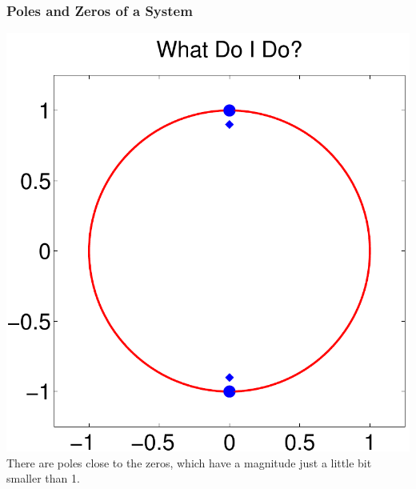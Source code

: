 \documentclass[mathserif,9pt,handout]{beamer}
\begin{document}
\begin{frame}\frametitle{Poles and Zeros of a System}\small
  \begin{center}
    \includegraphics[height=.7\textheight]{notch_zp.pdf} \\
    There are poles close to the zeros, which have a magnitude just a little bit smaller than 1. 
  \end{center}
\end{frame}
\end{document}
